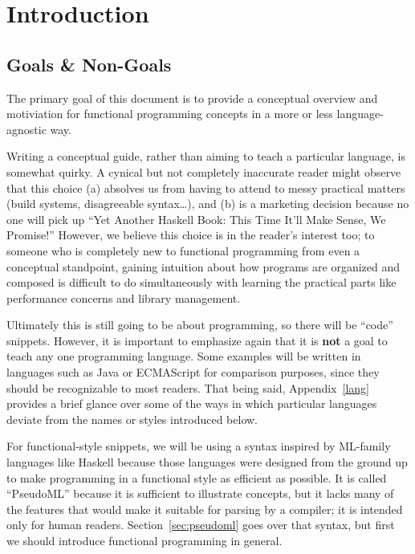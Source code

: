 
\chapter{Introduction}

\section{Goals \& Non-Goals}

The primary goal of this document is to provide a conceptual overview and motiviation for functional programming concepts in a more or less language-agnostic way.

Writing a conceptual guide, rather than aiming to teach a particular language, is somewhat quirky. A cynical but not completely inaccurate reader might observe that this choice (a) absolves us from having to attend to messy practical matters (build systems, disagreeable syntax\ldots), and (b) is a marketing decision because no one will pick up ``Yet Another Haskell Book: This Time It'll Make Sense, We Promise!'' However, we believe this choice is in the reader's interest too; to someone who is completely new to functional programming from even a conceptual standpoint, gaining intuition about how programs are organized and composed is difficult to do simultaneously with learning the practical parts like performance concerns and library management.

Ultimately this is still going to be about programming, so there will be ``code'' snippets. However, it is important to emphasize again that it is \textbf{not} a goal to teach any one programming language. Some examples will be written in languages such as Java or ECMAScript for comparison purposes, since they should be recognizable to most readers. That being said, Appendix~\ref{lang} provides a brief glance over some of the ways in which particular languages deviate from the names or styles introduced below.

For functional-style snippets, we will be using a syntax inspired by ML-family languages like Haskell because those languages were designed from the ground up to make programming in a functional style as efficient as possible. It is called ``PseudoML'' because it is sufficient to illustrate concepts, but it lacks many of the features that would make it suitable for parsing by a compiler; it is intended only for human readers. Section~\ref{sec:pseudoml} goes over that syntax, but first we should introduce functional programming in general.

